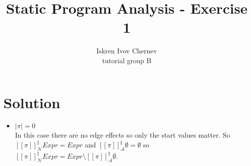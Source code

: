 \documentclass[a4paper]{article}
\begin{document}
\newcommand{\aee}[1] {[[#1]]^\sharp}
\newcommand{\cc}[1] {\texttt{#1}}
\def\A {\mathcal{A}}
\def\N {\mathcal{N}}
\def\NonZero {\mathrm{NonZero}}
\def\Zero {\mathrm{Zero}}
\def\Occ {\mathrm{Occ}}

\title{Static Program Analysis - Exercise 1}
\author{Iskren Ivov Chernev \\ tutorial group B}

\maketitle

\section{Solution}
\begin{itemize}
  \item $ | \pi | = 0 $ \\
  In this case there are no edge effects so only the start values matter. So
  $ \aee{\pi}_\N Expr = Expr $ and $ \aee{\pi}_\A \emptyset = \emptyset $ so
  $ \aee{\pi}_\N Expr = Expr \setminus \aee{\pi}_\A \emptyset $.


\end{itemize}
\end{document}
